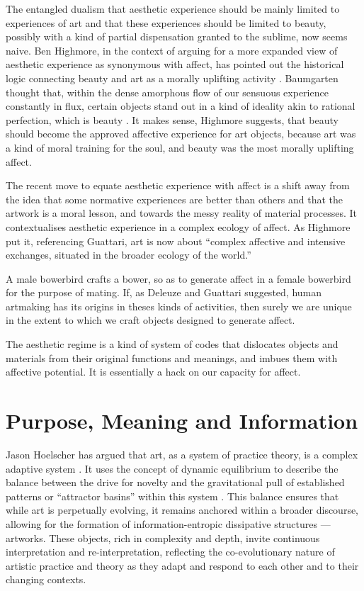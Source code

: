 \documentclass[letterpaper]{article}
\begin{document}
    The entangled dualism that aesthetic experience should be mainly limited to experiences of art and that these experiences should be limited to beauty, possibly with a kind of partial dispensation granted to the sublime, now seems naive. Ben Highmore, in the context of arguing for a more expanded view of aesthetic experience as synonymous with affect, has pointed out the historical logic connecting beauty and art as a morally uplifting activity \citep[p.121-122]{HighmoreBttrAftrTst2010}. Baumgarten thought that, within the dense amorphous flow of our sensuous experience constantly in flux, certain objects stand out in a kind of ideality akin to rational perfection, which is beauty \citep[p.328]{EagletonFrPrtclrs1990}. It makes sense, Highmore suggests, that beauty should become the approved affective experience for art objects, because art was a kind of moral training for the soul, and beauty was the most morally uplifting affect.
        
    The recent move to equate aesthetic experience with affect is a shift away from the idea that some normative experiences are better than others and that the artwork is a moral lesson, and towards the messy reality of material processes. It contextualises aesthetic experience in a complex ecology of affect. As Highmore put it, referencing Guattari, art is now about “complex affective and intensive exchanges, situated in the broader ecology of the world.” \citep[p.155]{HighmoreBttrAftrTst2010}

    A male bowerbird crafts a bower, so as to generate affect in a female bowerbird for the purpose of mating. If, as Deleuze and Guattari suggested, human artmaking has its origins in theses kinds of activities, then surely we are unique in the extent to which we craft objects designed to generate affect.
    
    The aesthetic regime is a kind of system of codes that dislocates objects and materials from their original functions and meanings, and imbues them with affective potential. It is essentially a hack on our capacity for affect.

\section{Purpose, Meaning and Information}

    Jason Hoelscher has argued that art, as a system of practice theory, is a complex adaptive system \citep[p.38]{HoelscherNtsOnAtctlytcAsthtcs2015}. It uses the concept of dynamic equilibrium to describe the balance between the drive for novelty and the gravitational pull of established patterns or “attractor basins” within this system \citep[pp.41-42]{HoelscherNtsOnAtctlytcAsthtcs2015}. This balance ensures that while art is perpetually evolving, it remains anchored within a broader discourse, allowing for the formation of information-entropic dissipative structures — artworks. These objects, rich in complexity and depth, invite continuous interpretation and re-interpretation, reflecting the co-evolutionary nature of artistic practice and theory as they adapt and respond to each other and to their changing contexts. 
    
\end{document}

